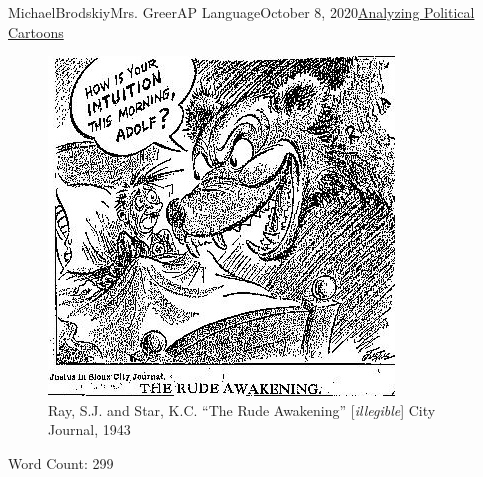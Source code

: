 \documentclass[12pt,letterpaper]{article}
\begin{document}
\begin{mla}{Michael}{Brodskiy}{Mrs. Greer}{AP Language}{October 8, 2020}{\underline{Analyzing Political Cartoons}}
\begin{justifying}
    \begin{figure}[h]
      \centering
      \includegraphics[width=.6\textwidth]{../Figures/Stalingrad.jpg}
      \caption{Ray, S.J. and Star, K.C. ``The Rude Awakening'' [\textit{illegible}] City Journal, 1943}
      \label{fig:1}
    \end{figure}


\end{justifying}
\centering Word Count: 299

\end{mla}
\end{document}
